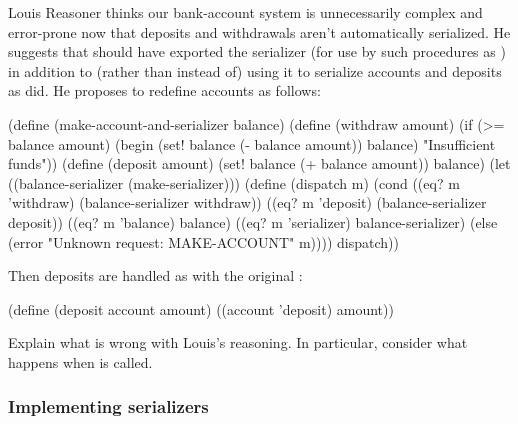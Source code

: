 \begin{exercise}
	\label{Exercise 3.45}
	Louis Reasoner thinks our bank-account system is unnecessarily complex and error-prone now that deposits and withdrawals aren’t automatically serialized.
	He suggests that  should have exported the serializer (for use by such procedures as ) in addition to (rather than instead of) using it to serialize accounts and deposits as  did.
	He proposes to redefine accounts as follows:
	\begin{smallscheme}
	  (define (make-account-and-serializer balance)
	    (define (withdraw amount)
	      (if (>= balance amount)
	          (begin (set! balance (- balance amount)) balance)
	          "Insufficient funds"))
	    (define (deposit amount)
	      (set! balance (+ balance amount)) balance)
	    (let ((balance-serializer (make-serializer)))
	      (define (dispatch m)
	        (cond ((eq? m 'withdraw) (balance-serializer withdraw))
	              ((eq? m 'deposit) (balance-serializer deposit))
	              ((eq? m 'balance) balance)
	              ((eq? m 'serializer) balance-serializer)
	              (else (error "Unknown request: MAKE-ACCOUNT" m))))
	      dispatch))
	\end{smallscheme}
	Then deposits are handled as with the original :
	\begin{scheme}
	  (define (deposit account amount)
	    ((account 'deposit) amount))
	\end{scheme}
	Explain what is wrong with Louis’s reasoning.
	In particular, consider what happens when  is called.
\end{exercise}



\subsubsection*{Implementing serializers}

